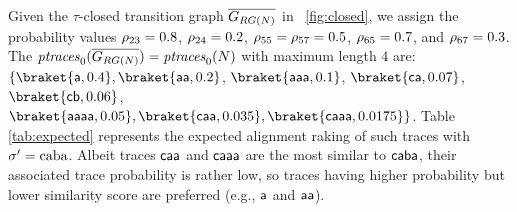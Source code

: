 \begin{table}[!t]
\centering
\caption{Golden ranking of the paths $\ptraces{\closed{\tg_{\rg{\net}}}}{0}$ with maximum length $4$, where $\logtrace=\const{caba}$ and $c=5$.}\label{tab:expected}
\end{table}
\begin{example}\label{ex:rankingTaus}
Given the $\tau$-closed transition graph $\closed{\tg_{\rg{\net}}}$ in \figurename~\ref{fig:closed}, we assign the probability values
$\pa=0.8$, $\pb=0.2$, $\pc=\pf=0.5$, $\pd=0.7$, and $\pe=0.3$. The $\ptraces{\expN}{0}=\ptraces{N}{0}$ with maximum length $4$ are:
$\{\braket{\const{a},0.4},\braket{\const{aa},0.2}$, $\braket{\const{aaa},0.1}$, $\braket{\const{ca},0.07}$, $\braket{\const{cb},0.06}$,
$\braket{\const{aaaa},0.05},\braket{\const{caa},0.035},\braket{\const{caaa},0.0175}\}$. Table \ref{tab:expected} represents the expected alignment raking of such traces with  $\nonlogtrace=\textup{caba}$.  Albeit traces $\const{caa}$ and $\const{caaa}$ are the most similar to $\const{caba}$, their associated trace probability  is rather low, so traces having higher probability but lower similarity score are preferred (e.g., $\const{a}$ and $\const{aa}$).
\end{example}
	
